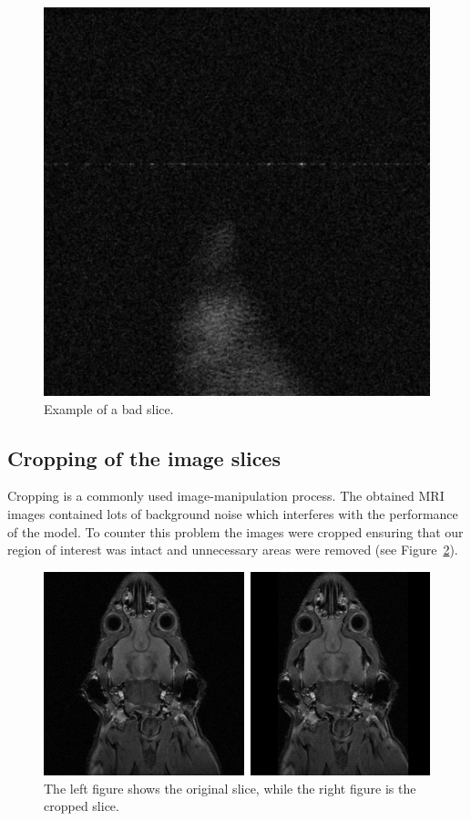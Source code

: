 \documentclass[twocolumn]{article}
\begin{document}
\begin{figure}[H]
    \centering
    \includegraphics[width=0.8\linewidth]{bad_slice.png}
    \caption{Example of a bad slice.}
    \label{fig:bad slice}
\end{figure}

\subsection{Cropping of the image slices}

Cropping is a commonly used image-manipulation process. The obtained MRI images contained lots of background noise which interferes with the performance of the model. 
To counter this problem the images were cropped ensuring that our region of interest was intact and unnecessary areas were removed (see Figure~\ref{fig:comparision-cropped}).  

\begin{figure}
    \centering
    \includegraphics[width=0.85\linewidth]{comparision cropped vs non cropped.png}
    \caption{The left figure shows the original slice, while the right figure is the cropped slice.}
    \label{fig:comparision-cropped}
\end{figure}
\end{document}
